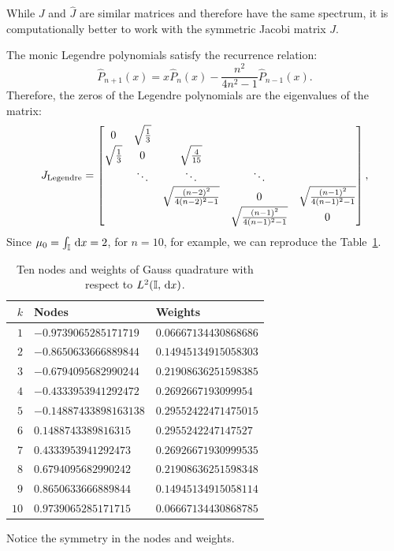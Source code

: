 \begin{remark}
While $J$ and $\hat{J}$ are similar matrices and therefore have the same spectrum, it is computationally better to work with the symmetric Jacobi matrix $J$.
\end{remark}

\begin{example}
The monic Legendre polynomials satisfy the recurrence relation:
\[
\hat{P}_{n+1}(x) = x\hat{P}_n(x) - \dfrac{n^2}{4n^2-1}\hat{P}_{n-1}(x).
\]
Therefore, the zeros of the Legendre polynomials are the eigenvalues of the matrix:
\[
J_{\rm Legendre} =  \begin{bmatrix}
0 & \sqrt{\tfrac{1}{3}}\\
\sqrt{\tfrac{1}{3}} & 0 & \sqrt{\tfrac{4}{15}}\\
& \ddots & \ddots & \ddots\\
& & \sqrt{\tfrac{(n-2)^2}{4(n-2)^2-1}} & 0 & \sqrt{\tfrac{(n-1)^2}{4(n-1)^2-1}}\\
& & & \sqrt{\tfrac{(n-1)^2}{4(n-1)^2-1}} & 0\\
\end{bmatrix},
\]
Since $\mu_0 = \int_{\mathbb{I}}{\rm\,d} x = 2$, for $n=10$, for example, we can reproduce the Table~\ref{table:GaussLegendre}.
\begin{table}[htdp]
\caption{Ten nodes and weights of Gauss quadrature with respect to $L^2(\mathbb{I},{\rm\,d} x)$.}
\begin{center}
\begin{tabular}{rll}
\hline
$k$ & Nodes & Weights\\
\hline
$1$ & $-0.9739065285171719$ & $0.06667134430868686$\\
$2$ & $-0.8650633666889844$ & $0.14945134915058303$\\
$3$ & $-0.6794095682990244$ & $0.21908636251598385$\\
$4$ & $-0.4333953941292472$ & $0.2692667193099954$\\
$5$ & $-0.14887433898163138$ & $0.29552422471475015$\\
$6$ & $0.1488743389816315$ & $0.2955242247147527$\\
$7$ & $0.4333953941292473$ & $0.26926671930999535$\\
$8$ & $0.6794095682990242$ & $0.21908636251598348$\\
$9$ & $0.8650633666889844$ & $0.14945134915058114$\\
$10$ & $0.9739065285171715$ &  $0.06667134430868785$\\
\hline
\end{tabular}
\end{center}
\label{table:GaussLegendre}
\end{table}%
Notice the symmetry in the nodes and weights.
\end{example}

